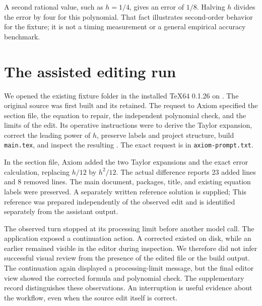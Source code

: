 \documentclass{ltugboat}
\begin{document}
A second rational value, such as $h=1/4$, gives an error of $1/8$.
Halving $h$ divides the error by four for this polynomial. That fact
illustrates second-order behavior for the fixture; it is not a timing
measurement or a general empirical accuracy benchmark.

\section{The assisted editing run}
We opened the existing fixture folder in the installed TeX64 0.1.26
on \macOS. The original source was first built and its 
retained. The request to Axiom specified the section file, the equation
to repair, the independent polynomial check, and the limits of the
edit. Its operative instructions were to derive the Taylor expansion,
correct the leading power of $h$, preserve labels and project
structure, build \texttt{main.tex}, and inspect the resulting
. The exact request is in \texttt{axiom-prompt.txt}.

In the section file, Axiom added the two Taylor expansions and the
exact error calculation, replacing $h/12$ by
$h^2/12$. The actual difference reports 23 added lines and 8 removed
lines. The main document, packages, title, and existing equation labels
were preserved. A separately written reference solution is supplied;
This reference was prepared independently of the observed edit and is
identified separately from the assistant output.

The observed turn stopped at its processing limit before another
model call. The application exposed a continuation action. A corrected
 existed on disk, while an earlier  remained visible
in the editor during inspection. We therefore did not infer successful
visual review from the presence of the edited file or the build output.
The continuation again displayed a processing-limit message, but the
final editor view showed the corrected formula and polynomial check.
The supplementary record distinguishes these observations. An interruption
is useful evidence about the workflow, even when the source edit itself
is correct.
\end{document}
